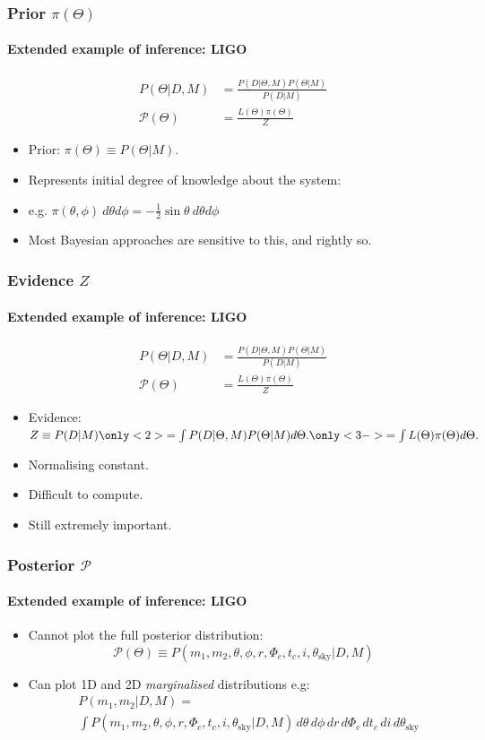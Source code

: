 \documentclass[%
]{beamer}
\begin{document}
\begin{frame}
    \frametitle{Prior $\pi(\Theta)$}
    \framesubtitle{Extended example of inference: LIGO}
    \begin{align}
        P(\Theta|D,M) &= \frac{P(D|\Theta, M) P(\Theta|M)}{P(D|M)}\nonumber\\
        \mathcal{P}(\Theta) &= \frac{L(\Theta) \pi(\Theta)}{Z}\nonumber
    \end{align}
    \begin{itemize}
        \pause\item Prior: $\pi(\Theta) \equiv P(\Theta|M)$.
        \pause\item Represents initial degree of knowledge about the system:
        \pause\item e.g. $\pi(\theta,\phi)\: d\theta d\phi = -\frac{1}{2}\sin\theta\: d\theta d\phi$
        \pause\item Most Bayesian approaches are sensitive to this, and rightly so.
    \end{itemize}
\end{frame}

\begin{frame}
    \frametitle{Evidence $Z$}
    \framesubtitle{Extended example of inference: LIGO}
    \begin{align}
        P(\Theta|D,M) &= \frac{P(D|\Theta, M) P(\Theta|M)}{P(D|M)}\nonumber\\
        \mathcal{P}(\Theta) &= \frac{L(\Theta) \pi(\Theta)}{Z}\nonumber
    \end{align}
    \begin{itemize}
        \item<1-> Evidence: $Z \equiv P(D|M) 
            \only<2>{=\int P(D|\Theta,M)P(\Theta|M) d\Theta.}
            \only<3->{=\int L(\Theta)\pi(\Theta) d\Theta.}$
        \item<4-> Normalising constant.
        \item<5-> Difficult to compute.
        \item<6-> Still extremely important.
    \end{itemize}
\end{frame}
\begin{frame}
    \frametitle{Posterior $\mathcal{P}$}
    \framesubtitle{Extended example of inference: LIGO}
    \begin{itemize}
        \item Cannot plot the full posterior distribution:
            \[\mathcal{P}(\Theta) \equiv P(m_1,m_2,\theta,\phi,r,\Phi_c, t_c, i, \theta_\mathrm{sky}|D,M)\]
        \item Can plot 1D and 2D {\em marginalised\/} distributions e.g:
            \begin{align}
            &P(m_1,m_2|D,M)=\nonumber\\&\int P(m_1,m_2,\theta,\phi,r,\Phi_c, t_c, i, \theta_\mathrm{sky}|D,M) \,d\theta \,d\phi \,dr \,d\Phi_c \,d t_c \,d i \,d\theta_\mathrm{sky}\nonumber
            \end{align}
    \end{itemize}
\end{frame}
\end{document}
